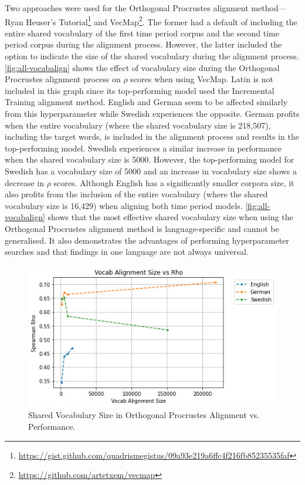 Two approaches were used for the Orthogonal Procrustes alignment method—Ryan Heuser’s Tutorial\footnote{\url{https://gist.github.com/quadrismegistus/09a93e219a6ffc4f216fb85235535faf}} and VecMap\footnote{\url{https://github.com/artetxem/vecmap}}. The former had a default of including the entire shared vocabulary of the first time period corpus and the second time period corpus during the alignment process. However, the latter included the option to indicate the size of the shared vocabulary during the alignment process. \autoref{fig:all-vocabalign} shows the effect of vocabulary size during the Orthogonal Procrustes alignment process on $\rho$ scores when using VecMap. Latin is not included in this graph since its top-performing model used the Incremental Training alignment method. English and German seem to be affected similarly from this hyperparameter while Swedish experiences the opposite. German profits when the entire vocabulary (where the shared vocabulary size is 218,507), including the target words, is included in the alignment process and results in the top-performing model. Swedish experiences a similar increase in performance when the shared vocabulary size is 5000. However, the top-performing model for Swedish has a vocabulary size of 5000 and an increase in vocabulary size shows a decrease in $\rho$ scores. Although English has a significantly smaller corpora size, it also profits from the inclusion of the entire vocabulary (where the shared vocabulary size is 16,429) when aligning both time period models. \autoref{fig:all-vocabalign} shows that the most effective shared vocabulary size when using the Orthogonal Procrustes alignment method is language-specific and cannot be generalised. It also demonstrates the advantages of performing hyperparameter searches and that findings in one language are not always universal.

\begin{figure}[h]
  \centering
  \includegraphics[width=.8\linewidth]{sections/figures/vocabalignment_all.png}
  \caption{Shared Vocabulary Size in Orthogonal Procrustes Alignment vs. Performance.}
  \label{fig:all-vocabalign}
\end{figure}


